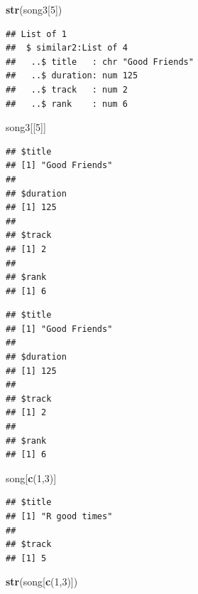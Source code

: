 \documentclass[]{book}
\newenvironment{Shaded}{\begin{snugshade}}{\end{snugshade}}
\newcommand{\KeywordTok}[1]{\textcolor[rgb]{0.13,0.29,0.53}{\textbf{{#1}}}}
\newcommand{\DecValTok}[1]{\textcolor[rgb]{0.00,0.00,0.81}{{#1}}}
\newcommand{\NormalTok}[1]{{#1}}
\begin{document}
\begin{Shaded}
\begin{Highlighting}[]
\KeywordTok{str}\NormalTok{(song3[}\DecValTok{5}\NormalTok{])}
\end{Highlighting}
\end{Shaded}

\begin{verbatim}
## List of 1
##  $ similar2:List of 4
##   ..$ title   : chr "Good Friends"
##   ..$ duration: num 125
##   ..$ track   : num 2
##   ..$ rank    : num 6
\end{verbatim}

\begin{Shaded}
\begin{Highlighting}[]
\NormalTok{song3[[}\DecValTok{5}\NormalTok{]]}
\end{Highlighting}
\end{Shaded}

\begin{verbatim}
## $title
## [1] "Good Friends"
## 
## $duration
## [1] 125
## 
## $track
## [1] 2
## 
## $rank
## [1] 6
\end{verbatim}

\begin{Shaded}
\end{Shaded}

\begin{verbatim}
## $title
## [1] "Good Friends"
## 
## $duration
## [1] 125
## 
## $track
## [1] 2
## 
## $rank
## [1] 6
\end{verbatim}

\begin{Shaded}
\begin{Highlighting}[]
\NormalTok{song[}\KeywordTok{c}\NormalTok{(}\DecValTok{1}\NormalTok{,}\DecValTok{3}\NormalTok{)]}
\end{Highlighting}
\end{Shaded}

\begin{verbatim}
## $title
## [1] "R good times"
## 
## $track
## [1] 5
\end{verbatim}

\begin{Shaded}
\begin{Highlighting}[]
\KeywordTok{str}\NormalTok{(song[}\KeywordTok{c}\NormalTok{(}\DecValTok{1}\NormalTok{,}\DecValTok{3}\NormalTok{)])}
\end{Highlighting}
\end{Shaded}
\end{document}
